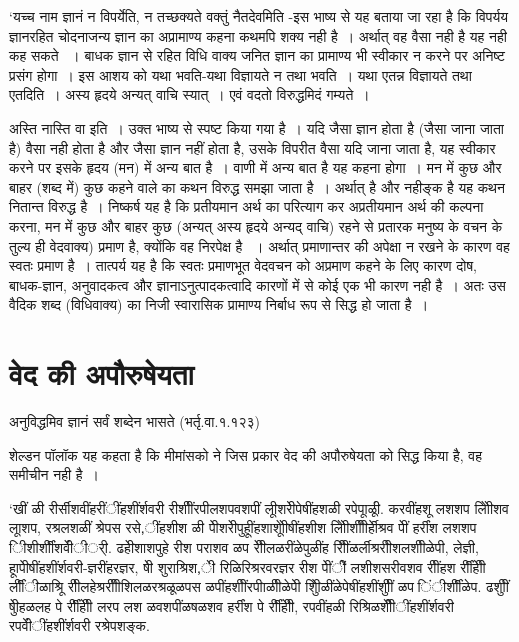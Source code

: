 {‘यच्च नाम ज्ञानं न विपर्येति, न तच्छक्यते वक्तुं नैतदेवमिति -इस भाष्य से यह बताया जा रहा है कि विपर्यय ज्ञानरहित चोदनाजन्य ज्ञान का अप्रामाण्य कहना कथमपि शक्य नही है~। अर्थात् वह वैसा नही है यह नही कह सकते ~। बाधक ज्ञान से रहित विधि वाक्य जनित ज्ञान का प्रामाण्य भी स्वीकार न करने पर अनिष्ट प्रसंग होगा~। इस आशय को यथा भवति-यथा विज्ञायते न तथा भवति~। यथा एतन्न विज्ञायते तथा एतदिति~। अस्य हृदये अन्यत् वाचि स्यात्~। एवं वदतो विरुद्धमिदं गम्यते~।

अस्ति नास्ति वा इति~। उक्त भाष्य से स्पष्ट किया गया है~। यदि जैसा ज्ञान होता है (जैसा जाना जाता है) वैसा नही होता है और जैसा ज्ञान नहीं होता है, उसके विपरीत वैसा यदि जाना जाता है, यह स्वीकार करने पर इसके हृदय (मन) में अन्य बात है~। वाणी में अन्य बात है यह कहना होगा~। मन में कुछ और बाहर (शब्द में) कुछ कहने वाले का कथन विरुद्ध समझा जाता है~। अर्थात् है और नहीङ्क है यह कथन नितान्त विरुद्ध है~। निष्कर्ष यह है कि प्रतीयमान अर्थ का परित्याग कर अप्रतीयमान अर्थ की कल्पना करना, मन में कुछ और बाहर कुछ (अन्यत् अस्य हृदये अन्यद् वाचि) रहने से प्रतारक मनुष्य के वचन के तुल्य ही वेदवाक्य) प्रमाण है, क्योंकि वह निरपेक्ष  है ~। अर्थात् प्रमाणान्तर की अपेक्षा न रखने के कारण वह स्वतः प्रमाण है~। तात्पर्य यह है कि स्वतः प्रमाणभूत वेदवचन को अप्रमाण कहने के लिए कारण दोष, बाधक-ज्ञान, अनुवादकत्व और ज्ञानाऽनुत्पादकत्वादि कारणों में से कोई एक भी कारण नही है~। अतः उस वैदिक शब्द (विधिवाक्य) का निजी स्वारासिक प्रामाण्य निर्बाध रूप से सिद्ध हो जाता है~।

\section*{वेद की अपौरुषेयता}

अनुविद्धमिव ज्ञानं सर्वं शब्देन भासते (भर्तृ.वा.१.१२३)

शेल्डन पॉलॉक यह कहता है कि मीमांसको ने जिस प्रकार वेद की अपौरुषेयता को सिद्ध किया है, वह समीचीन नही है~।

‘खीं ळी रीर्सीशवींहरींींहशींर्शवरी रीशीींरपीलशपवशपीं लूीशरीेपेषींहशळी रपेपूाळीूं. करवींहशू लशशप लोिेीशव लूाशप, रश्रलशळीं श्रेपस रसे,ींहशीश ळी पेीशरीेपुहूींहशाशोीूेषींहशीश लोिेीशीीीर्हेीश्रव पेीं हर्रींश लशशप िीशीर्शीींशवीेंीर्ी. ढहेीशाशपुहे रीश पराशव ळप रीीेलळरींळेपुळींह रिीींळर्लीश्ररीीशलशीीळेपी, लेज्ञी, हूापीेषींहशींर्शवरी-ज्ञरींहरज्ञर, षेी शुराश्रिश,ेी रिळिरिश्ररवरज्ञर रीश पेींीें लशीशसरीवशव रीींहश र्रीींहेीी र्लीींीळाश्रिू रीीलहेश्ररीीीशिलळरश्रळूळपस ळपींहशीींरपीाळीीळेपेी शुिेीळींळेपेषींहशींशुीीं ळप िंीर्शीींळेप. ढशुीीं षेीुहळलह पे र्रीींहेीी लरप लश ळवशपींळषळशव हर्रींश पे र्रीींहेीी, रपवींहळी रिश्रिळशीीेंींहशींर्शवरी रपवीेंींहशींर्शवरी रश्रेपशङ्क.

}
